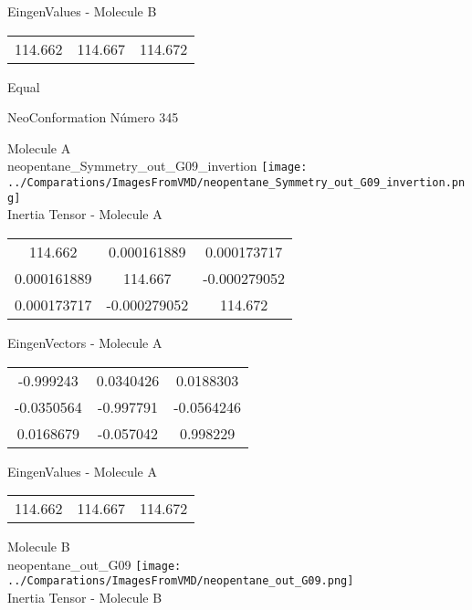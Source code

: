 \begin{multicols}{2}
\begin{center}
\vtab
 EingenValues - Molecule B     \\
\vtab
\begin{tabular}{|c c c|}
114.662	 & 	114.667	 & 	114.672	 \\
\end{tabular}

\end{center}
\end{multicols}
\begin{center}
\vtab
\vtab
\textcolor{NavyBlue}{\Large Equal}
\end{center}

 \newpage

\vtab[-2cm]
\begin{center}
{\large NeoConformation \tab Número 345}
\end{center}
\begin{multicols}{2}
\begin{center}

Molecule A \\ 
neopentane\_Symmetry\_out\_G09\_invertion
\texttt{[image: ../Comparations/ImagesFromVMD/neopentane\_Symmetry\_out\_G09\_invertion.png]}
\\
Inertia Tensor - Molecule A \\
\vtab

\begin{tabular}{|c c c|}
114.662	 & 	0.000161889	 & 	0.000173717	 \\
0.000161889	 & 	114.667	 & 	-0.000279052	 \\
0.000173717	 & 	-0.000279052	 & 	114.672
\end{tabular}

\vtab
 EingenVectors - Molecule A     \\
\vtab
\begin{tabular}{|c c c|}
-0.999243	 & 	0.0340426	 & 	0.0188303	 \\
-0.0350564	 & 	-0.997791	 & 	-0.0564246	 \\
0.0168679	 & 	-0.057042	 & 	0.998229
\end{tabular}

\vtab
 EingenValues - Molecule A     \\
\vtab
\begin{tabular}{|c c c|}
114.662	 & 	114.667	 & 	114.672	 \\
\end{tabular}
\columnbreak

Molecule B \\ 
neopentane\_out\_G09
\texttt{[image: ../Comparations/ImagesFromVMD/neopentane\_out\_G09.png]}
\\
Inertia Tensor - Molecule B \\
\vtab


\end{center}
\end{multicols}
